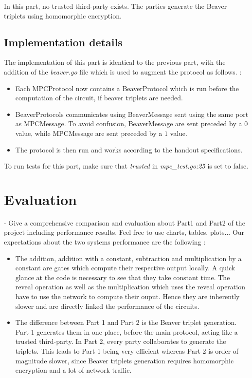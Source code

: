 \documentclass[10pt,conference]{IEEEtran}
\begin{document}
In this part, no trusted third-party exists. The parties generate the Beaver triplets using homomorphic encryption.
\subsection{Implementation details}
The implementation of this part is identical to the previous part, with the addition of the \textit{beaver.go} file which is used to augment the protocol as follows. : 
\begin{itemize}
    \item Each MPCProtocol now contains a BeaverProtocol which is run before the computation of the circuit, if beaver triplets are needed.
    \item BeaverProtocols communicates using BeaverMessage sent using the same port as MPCMessage. To avoid confusion, BeaverMessage are sent preceded by a $0$ value, while MPCMessage are sent preceded by a $1$ value.
    \item The protocol is then run and works according to the handout specifications.
\end{itemize}

To run tests for this part, make sure that \textit{trusted} in \textit{mpc\_test.go:25} is set to false.
\section{Evaluation}
- Give a comprehensive comparison and evaluation about Part1 and Part2 of the project including performance results. Feel free to use charts, tables, plots...
Our expectations about the two systems performance are the following :
\begin{itemize}
    \item The addition, addition with a constant, subtraction and multiplication by a constant are gates which compute their respective output locally. A quick glance at the code is necessary to see that they take constant time. The reveal operation as well as the multiplication which uses the reveal operation have to use the network to compute their ouput. Hence they are inherently slower and are directly linked the performance of the circuits.
    \item The difference between Part 1 and Part 2 is the Beaver triplet generation. Part 1 generates them in one place, before the main protocol, acting like a trusted third-party. In Part 2, every party collaborates to generate the triplets. This leads to Part 1 being very efficient whereas Part 2 is order of magnitude slower, since Beaver triplets generation requires homomorphic encryption and a lot of network traffic. %
\end{itemize}
\end{document}

